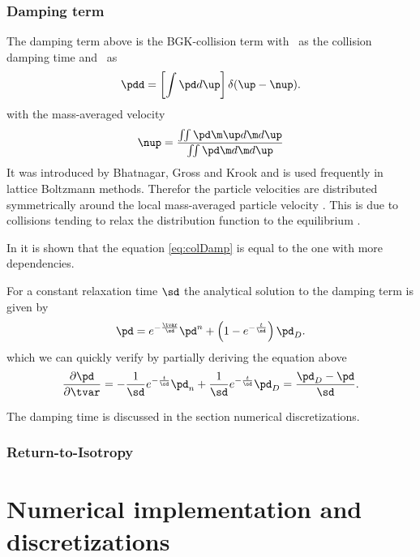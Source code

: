 \color{gray}
\subsubsection{Damping term}
\label{sec:damping}
The damping term above is the BGK-collision term with \sd \ as the collision damping time and \pdd \ as
\begin{equation}
    \label{eq:colDamp}
    \pdd = \left[ \int \pd d \up \right] \delta (\up - \nup).
\end{equation}
with the mass-averaged velocity
\begin{equation}
    \nup = \dfrac{\MultiIntegral{2}  \pd \m \up d \m d  \up}{\MultiIntegral{2} \pd \m d \m d \up}
\end{equation}
It was introduced by Bhatnagar, Gross and Krook and is used frequently in lattice Boltzmann methods.
Therefor the particle velocities are distributed symmetrically around the local mass-averaged particle velocity \nup. This is due to collisions tending to relax the distribution function to the equilibrium \pdd.

In %
it is shown that the equation \eqref{eq:colDamp} is equal to the one with more dependencies.


For a constant relaxation time $\sd$ the analytical solution to the damping term is given by
\begin{equation}
    \label{eq:BGKanalytical}
    \pd = e^{-\frac{\tvar}{\sd}} \pd^n + \left(1-e^{- \frac{t}{\sd}} \right) \pd_{D}.
\end{equation}
which we can quickly verify by partially deriving the equation above
\begin{equation}
    \dfrac{\partial \pd}{\partial \tvar} = - \dfrac{1}{\sd} e^{- \frac{t}{\sd}} \pd_n + \dfrac{1}{\sd} e^{- \frac{t}{\sd}} \pd_D = \dfrac{\pd_D - \pd}{\sd}.
\end{equation}

The damping time is discussed in the section numerical discretizations.


\subsubsection{Return-to-Isotropy}

\color{black}
\section{Numerical implementation and discretizations}
